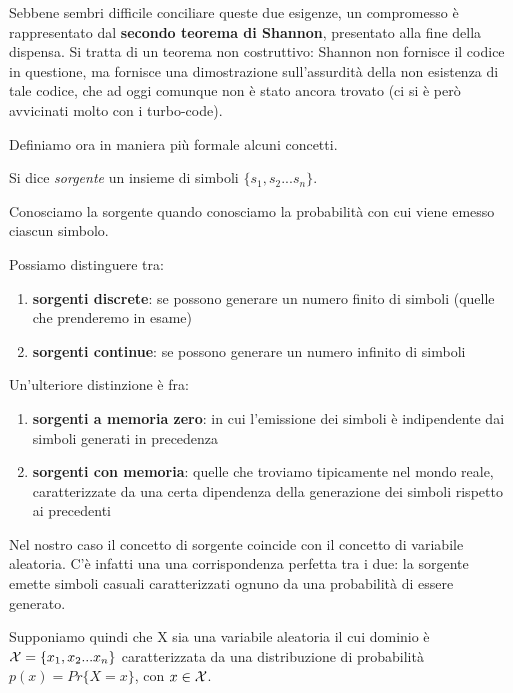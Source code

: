 Sebbene sembri difficile conciliare queste due esigenze, un compromesso è rappresentato dal \textbf{secondo teorema di Shannon}, presentato alla fine della dispensa. Si tratta di un teorema non costruttivo: Shannon non fornisce il codice in questione, ma fornisce una dimostrazione sull'assurdità della non esistenza di tale codice, che ad oggi comunque non è stato ancora trovato (ci si è però avvicinati molto con i turbo-code).

\noindent
Definiamo ora in maniera più formale alcuni concetti.

\begin{definizione}[sorgente]
Si dice \textit{sorgente} un insieme di simboli \(\{s_1, s_2 ... s_n\}\).
\end{definizione}

\noindent
Conosciamo la sorgente quando conosciamo la probabilità con cui viene emesso ciascun simbolo.

\noindent
Possiamo distinguere tra:
\begin{enumerate}
\item \textbf{sorgenti discrete}: se possono generare un numero finito di simboli (quelle che prenderemo in esame)
\item \textbf{sorgenti continue}: se possono generare un numero infinito di simboli
\end{enumerate}

\noindent
Un'ulteriore distinzione è fra:
\begin{enumerate}
\item \textbf{sorgenti a memoria zero}: in cui l'emissione dei simboli è indipendente dai simboli generati in precedenza
\item \textbf{sorgenti con memoria}: quelle che troviamo tipicamente nel mondo reale, caratterizzate da una certa dipendenza della generazione dei simboli rispetto ai precedenti
\end{enumerate}

Nel nostro caso il concetto di sorgente coincide con il concetto di variabile aleatoria. C'è infatti una una corrispondenza perfetta tra i due: la sorgente emette simboli casuali caratterizzati ognuno da una probabilità di essere generato.

Supponiamo quindi che X sia una variabile aleatoria il cui dominio è \(\mathcal{X} = \{x_1, x_2 ... x_n\}\) caratterizzata da una distribuzione di probabilità \(p(x) = Pr\{X = x\}\), con \(x \in \mathcal{X}\).


